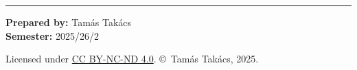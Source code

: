 \documentclass[11pt,a4paper]{scrartcl}
\begin{document}
\vspace{2em}

\noindent\rule{\textwidth}{0.5pt}

\vspace{0.5em}
\noindent\textbf{Prepared by:} Tamás Takács \\
\textbf{Semester:} 2025/26/2

\vspace{1em}
\begin{center}
    \footnotesize\color{accentcolor} Licensed under \href{https://creativecommons.org/licenses/by-nc-nd/4.0/}{CC BY-NC-ND 4.0}. \copyright~Tamás Takács, 2025.
\end{center}
 
\end{document}
